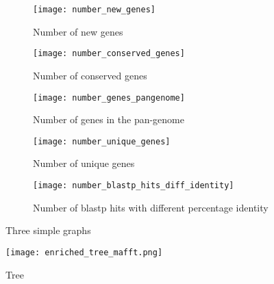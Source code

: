 \graphicspath{{images/pangenomeAnalysis/}{images/phylogeneticStructureHostData}}


\begin{figure} 
     \centering
     \begin{subfigure}[b]{0.45\textwidth}
        \centering
        \texttt{[image: number\_new\_genes]}
        \caption{Number of new genes}
        \label{fig:new genes}
     \end{subfigure}
     \hfill
     \begin{subfigure}[b]{0.45\textwidth}
        \centering
        \texttt{[image: number\_conserved\_genes]}
        \caption{Number of conserved genes}
        \label{fig:conserved genes}
     \end{subfigure}
     \hfill
     \begin{subfigure}[b]{0.45\textwidth}
        \centering
        \texttt{[image: number\_genes\_pangenome]}
        \caption{Number of genes in the pan-genome}
        \label{fig:pagenome genes}
     \end{subfigure}
     \hfill
     \begin{subfigure}[b]{0.45\textwidth}
        \centering
        \texttt{[image: number\_unique\_genes]}
        \caption{Number of unique genes}
        \label{fig:unique genes}
     \end{subfigure}
     \hfill
     \begin{subfigure}[b]{0.45\textwidth}
        \centering
        \texttt{[image: number\_blastp\_hits\_diff\_identity]}
        \caption{Number of blastp hits with different percentage identity}
        \label{fig:blastp identity}
     \end{subfigure}
        \caption{Three simple graphs}
        \label{fig:genes vs genomes}
\end{figure}




\begin{figure}
   \centering
   \texttt{[image: enriched\_tree\_mafft.png]}
   \caption{Tree}
   \label{core alignement mafft tree}
\end{figure}


